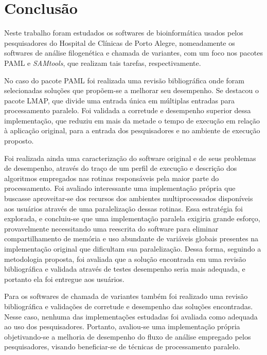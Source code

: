 \documentclass[cic,tc]{iiufrgs}
\begin{document}
\chapter{Conclusão}
\label{chap:conc}

Neste trabalho foram estudados os softwares de bioinformática usados pelos
pesquisadores do Hospital de Clínicas de Porto Alegre, nomeadamente os
softwares de análise filogenética e chamada de variantes, com um foco nos
pacotes PAML e \textit{SAMtools}, que realizam tais tarefas, respectivamente.

No caso do pacote PAML foi realizada uma revisão bibliográfica onde foram
selecionadas soluções que propõem-se a melhorar seu desempenho. Se destacou o
pacote LMAP, que divide uma entrada única em múltiplas entradas para
processamento paralelo. Foi validada a corretude e desempenho superior dessa
implementação, que reduziu em mais da metade o tempo de execução em relação à
aplicação original, para a entrada dos pesquisadores e no ambiente de execução
proposto.

Foi realizada ainda uma caracterização do software original e de seus
problemas de desempenho, através do traço de um perfil de execução e descrição
dos algoritmos empregados nas rotinas responsáveis pela maior parte do
processamento. Foi avaliado interessante uma implementação própria que buscasse
aproveitar-se dos recursos dos ambientes multiprocessados disponíveis aos
usuários através de uma paralelização dessas rotinas. Essa estratégia foi
explorada, e concluiu-se que uma implementação paralela exigiria grande
esforço, provavelmente necessitando uma reescrita do software para
eliminar compartilhamento de memória e uso abundante de variáveis globais
presentes na implementação original que dificultam sua paralelização.
Dessa forma, seguindo a metodologia proposta, foi avaliada que a solução
encontrada em uma revisão bibliográfica e validada através de testes desempenho
seria mais adequada, e portanto ela foi entregue aos usuários.

Para os softwares de chamada de variantes também foi realizado uma
revisão bibliográfica e validações de corretude e desempenho das soluções
encontradas. Nesse caso, nenhuma das implementações estudadas foi avaliada
como adequada ao uso dos pesquisadores. Portanto, avaliou-se uma implementação
própria objetivando-se a melhoria de desempenho do fluxo de análise empregado
pelos pesquisadores, visando beneficiar-se de técnicas de processamento
paralelo.
\end{document}
